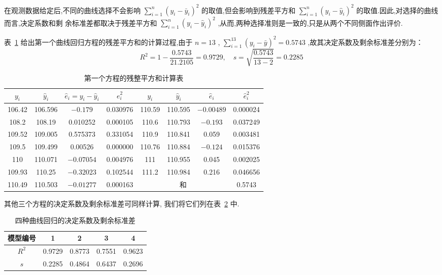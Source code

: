 在观测数据给定后,不同的曲线选择不会影响 $\sum_{i=1}^{n} (y_i-\bar{y}_i)^2$ 的取值,但会影响到残差平方和 $\sum_{i=1}^{n} (y_i-\hat{y}_i)^2$ 的取值.因此,对选择的曲线而言,决定系数和剩
余标准差都取决于残差平方和 $\sum_{i=1}^{n} (y_i-\hat{y}_i)^2$ ,从而,两种选择准则是一致的,只是从两个不同侧面作出评价.

表~\ref{tab:8.5.4} 给出第一个曲线回归方程的残差平方和的计算过程,由于 $n=13$ , $\sum_{i=1}^{13}(y_i-\bar{y})^2=0.5743$ ,故其决定系数及剩余标准差分别为：
\begin{equation*}
R^{2}=1-\frac{0.5743}{21.2105}=0.9729, \quad s=\sqrt{\frac{0.5743}{13-2}}=0.2285
\end{equation*}
\begin{table}[htbp]
  \renewcommand*{\arraystretch}{1.5}
    \centering
    \caption{第一个方程的残整平方和计算表}
    \begin{tabular}{cccc|cccc}
        \toprule
     $y_i$   &  $\hat{y}_i$  &  $\hat{e}_i=y_{i} - \hat{y}_i$  &  $\hat{e}_i^2$  &  $y_i$   &  $\hat{y}_i$  &  $\hat{e}_i$  &  $\hat{e}_i^2$  \\\midrule
        106.42 & 106.596 & $-0.179$ & 0.030976 & 110.59 & 110.595 & $-0.00489$ & 0.000024 \\
        108.2 & 108.19 & 0.010252 & 0.000105 & 110.6 & 110.793 & $-0.193$ & 0.037249 \\
        109.52 & 109.005 & 0.575373 & 0.331054 & 110.9 & 110.841 & 0.059 & 0.003481 \\
        109.5 & 109.499 & 0.00526 & 0.000000 & 110.76 & 110.884 & $-0.124$ & 0.015376 \\
        110   & 110.071 & $-0.07054$ & 0.004976 & 111   & 110.955 & 0.045 & 0.002025 \\
        109.93 & 110.25 & $-0.32023$ & 0.102544 & 111.2 & 110.984 & 0.216 & 0.046656 \\
        110.49 & 110.503 & $-0.01277$ & 0.000163 & \multicolumn{3}{c}{和} & 0.5743 \\\bottomrule
    \end{tabular}%
    \label{tab:8.5.4}%
\end{table}%
其他三个方程的决定系数及剩余标准差可同样计算, 我们将它们列在表~\ref{tab:8.5.5} 中.
\begin{table}[!htb]
    \centering
    \caption{四种曲线回归的决定系数及剩余标准差}
    \begin{tabular}{ccccc}
    \toprule
    模型编号  & 1      & 2      & 3      & 4      \\
    \midrule
    $R^2$    & 0.9729 & 0.8773 & 0.7551 & 0.9623 \\
    $s$      & 0.2285 & 0.4864 & 0.6437 & 0.2696 \\
    \bottomrule
    \end{tabular}%
    \label{tab:8.5.5}%
\end{table}%

